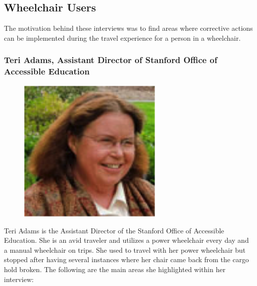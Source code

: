 \subsection*{Wheelchair Users}
The motivation behind these interviews was to find areas where corrective actions can be implemented during the travel experience for a person in a wheelchair.

\subsubsection{Teri Adams, Assistant Director of Stanford Office of Accessible Education}
\begin{figure}[h]
  \centering
     \includegraphics[width=7cm]{images/image022}
  \label{fig:22}
\end{figure}

Teri Adams is the Assistant Director of the Stanford Office of Accessible Education.  She is an avid traveler and utilizes a power wheelchair every day and a manual wheelchair on trips. She used to travel with her power wheelchair but stopped after having several instances where her chair came back from the cargo hold broken. The following are the main areas she highlighted within her interview:

